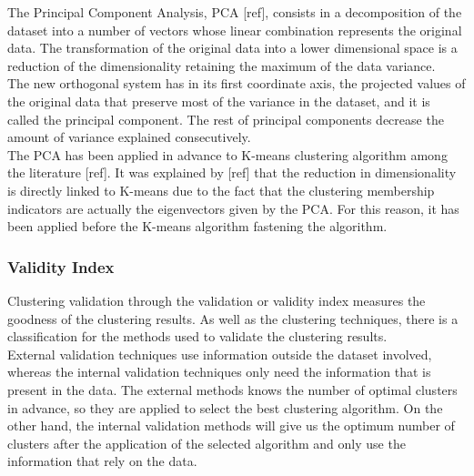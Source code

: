 The Principal Component Analysis, PCA [ref], consists in a decomposition of the dataset into a number of vectors whose linear combination represents the original data. The transformation of the original data into a lower dimensional space is a reduction of the dimensionality retaining the maximum of the data variance.\\

The new orthogonal system has in its first coordinate axis, the projected values of the original data that preserve most of the variance in the dataset, and it is called the principal component. The rest of principal components decrease the amount of variance explained consecutively.\\

The PCA has been applied in advance to K-means clustering algorithm among the literature [ref]. It was explained by [ref] that the reduction in dimensionality is directly linked to K-means due to the fact that the clustering membership indicators are actually the eigenvectors given by the PCA. For this reason, it has been applied before the K-means algorithm fastening the algorithm.\\

\subsubsection{Validity Index}

Clustering validation through the validation or validity index measures the goodness of the clustering results. As well as the clustering techniques, there is a classification for the methods used to validate the clustering results.\\

External validation techniques use information outside the dataset involved, whereas the internal validation techniques only need the information that is present in the data. The external methods knows the number of optimal clusters in advance, so they are applied to select the best clustering algorithm. On the other hand, the internal validation methods will give us the optimum number of clusters after the application of the selected algorithm and only use the information that rely on the data.\\

